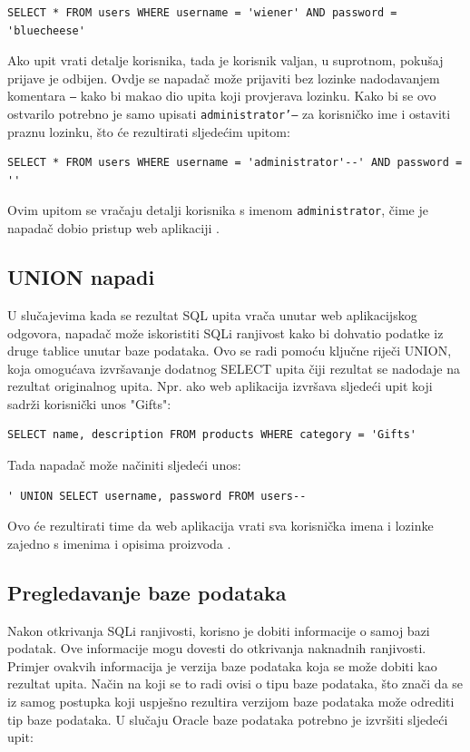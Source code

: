 \documentclass[12pt, oneside, onecolumn]{book}
\begin{document}
{\begin{verbatim}
SELECT * FROM users WHERE username = 'wiener' AND password = 'bluecheese'
\end{verbatim}

Ako upit vrati detalje korisnika, tada je korisnik valjan, u suprotnom, pokušaj prijave je odbijen. Ovdje se napadač može prijaviti bez lozinke nadodavanjem komentara \texttt{--} kako bi makao dio upita koji provjerava lozinku. Kako bi se ovo ostvarilo potrebno je samo upisati \texttt{administrator'--} za korisničko ime i ostaviti praznu lozinku, što će rezultirati sljedećim upitom:

\begin{verbatim}
SELECT * FROM users WHERE username = 'administrator'--' AND password = ''
\end{verbatim}

Ovim upitom se vračaju detalji korisnika s imenom \texttt{administrator}, čime je napadač dobio pristup web aplikaciji \cite{sitesqli}.

\subsection{UNION napadi}
U slučajevima kada se rezultat SQL upita vrača unutar web aplikacijskog odgovora, napadač može iskoristiti SQLi ranjivost kako bi dohvatio podatke iz druge tablice unutar baze podataka. Ovo se radi pomoću ključne riječi UNION, koja omogućava izvršavanje dodatnog SELECT upita čiji rezultat se nadodaje na rezultat originalnog upita. Npr. ako web aplikacija izvršava sljedeći upit koji sadrži korisnički unos "Gifts":

\begin{verbatim}
SELECT name, description FROM products WHERE category = 'Gifts'
\end{verbatim}

Tada napadač može načiniti sljedeći unos:

\begin{verbatim}
' UNION SELECT username, password FROM users--
\end{verbatim}

Ovo će rezultirati time da web aplikacija vrati sva korisnička imena i lozinke zajedno s imenima i opisima proizvoda \cite{sitesqli}.

\subsection{Pregledavanje baze podataka}
Nakon otkrivanja SQLi ranjivosti, korisno je dobiti informacije o samoj bazi podatak. Ove informacije mogu dovesti do otkrivanja naknadnih ranjivosti. Primjer ovakvih informacija je verzija baze podataka koja se može dobiti kao rezultat upita. Način na koji se to radi ovisi o tipu baze podataka, što znači da se iz samog postupka koji uspješno rezultira verzijom baze podataka može odrediti tip baze podataka. U slučaju Oracle baze podataka potrebno je izvršiti sljedeći upit:

}
\end{document}
